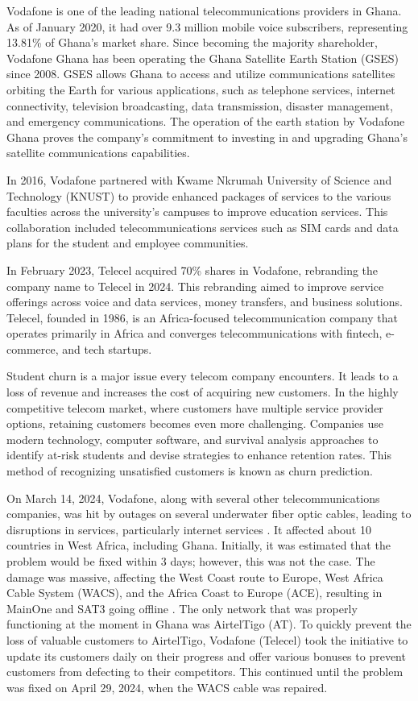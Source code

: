 \documentclass[12pt]{report}
\begin{document}
Vodafone is one of the leading national telecommunications providers in Ghana. As of January 2020, it had over 9.3 million mobile voice subscribers, representing 13.81\% of Ghana's market share. Since becoming the majority shareholder, Vodafone Ghana has been operating the Ghana Satellite Earth Station (GSES) since 2008. GSES allows Ghana to access and utilize communications satellites orbiting the Earth for various applications, such as telephone services, internet connectivity, television broadcasting, data transmission, disaster management, and emergency communications. The operation of the earth station by Vodafone Ghana proves the company's commitment to investing in and upgrading Ghana's satellite communications capabilities.

In 2016, Vodafone partnered with Kwame Nkrumah University of Science and Technology (KNUST) to provide enhanced packages of services to the various faculties across the university's campuses to improve education services. This collaboration included telecommunications services such as SIM cards and data plans for the student and employee communities.

In February 2023, Telecel acquired 70\% shares in Vodafone, rebranding the company name to Telecel in 2024. This rebranding aimed to improve service offerings across voice and data services, money transfers, and business solutions. Telecel, founded in 1986, is an Africa-focused telecommunication company that operates primarily in Africa and converges telecommunications with fintech, e-commerce, and tech startups.

Student churn is a major issue every telecom company encounters. It leads to a loss of revenue and increases the cost of acquiring new customers. In the highly competitive telecom market, where customers have multiple service provider options, retaining customers becomes even more challenging. Companies use modern technology, computer software, and survival analysis approaches to identify at-risk students and devise strategies to enhance retention rates. This method of recognizing unsatisfied customers is known as churn prediction.

On March 14, 2024, Vodafone, along with several other telecommunications companies, was hit by outages on several underwater fiber optic cables, leading to disruptions in services, particularly internet services \cite{ghanaweb2023}. It affected about 10 countries in West Africa, including Ghana. Initially, it was estimated that the problem would be fixed within 3 days; however, this was not the case. The damage was massive, affecting the West Coast route to Europe, West Africa Cable System (WACS), and the Africa Coast to Europe (ACE), resulting in MainOne and SAT3 going offline \cite{apnews2023}. The only network that was properly functioning at the moment in Ghana was AirtelTigo (AT). To quickly prevent the loss of valuable customers to AirtelTigo, Vodafone (Telecel) took the initiative to update its customers daily on their progress and offer various bonuses to prevent customers from defecting to their competitors. This continued until the problem was fixed on April 29, 2024, when the WACS cable was repaired.
\end{document}
